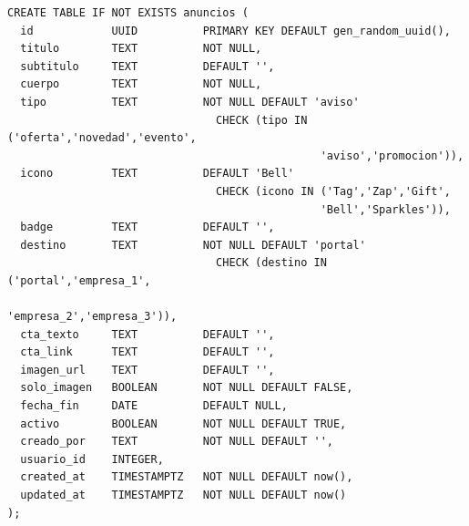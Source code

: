 \documentclass[11pt,a4paper]{article}
\begin{document}
\begin{verbatim}
CREATE TABLE IF NOT EXISTS anuncios (
  id            UUID          PRIMARY KEY DEFAULT gen_random_uuid(),
  titulo        TEXT          NOT NULL,
  subtitulo     TEXT          DEFAULT '',
  cuerpo        TEXT          NOT NULL,
  tipo          TEXT          NOT NULL DEFAULT 'aviso'
                                CHECK (tipo IN ('oferta','novedad','evento',
                                                'aviso','promocion')),
  icono         TEXT          DEFAULT 'Bell'
                                CHECK (icono IN ('Tag','Zap','Gift',
                                                'Bell','Sparkles')),
  badge         TEXT          DEFAULT '',
  destino       TEXT          NOT NULL DEFAULT 'portal'
                                CHECK (destino IN ('portal','empresa_1',
                                                'empresa_2','empresa_3')),
  cta_texto     TEXT          DEFAULT '',
  cta_link      TEXT          DEFAULT '',
  imagen_url    TEXT          DEFAULT '',
  solo_imagen   BOOLEAN       NOT NULL DEFAULT FALSE,
  fecha_fin     DATE          DEFAULT NULL,
  activo        BOOLEAN       NOT NULL DEFAULT TRUE,
  creado_por    TEXT          NOT NULL DEFAULT '',
  usuario_id    INTEGER,
  created_at    TIMESTAMPTZ   NOT NULL DEFAULT now(),
  updated_at    TIMESTAMPTZ   NOT NULL DEFAULT now()
);
\end{verbatim}
\end{document}
